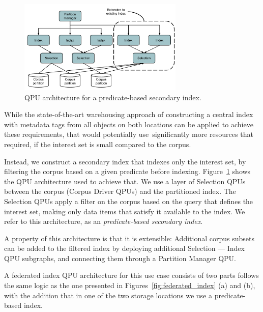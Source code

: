 \begin{figure}
  \centering
    \includegraphics[width=0.7\textwidth]{./figures/case_studies/predicate_based_index.pdf}
  \caption{QPU architecture for a predicate-based secondary index.}
  \label{fig:predicate_based_index}
\end{figure}

While the state-of-the-art warehousing approach of constructing a central index with metadata tags from all objects
on both locations can be applied to achieve these requirements,
that would potentially use significantly more resources that required,
if the interest set is small compared to the corpus.

Instead, we construct a secondary index that indexes only the interest set,
by filtering the corpus based on a given predicate before indexing.
Figure~\ref{fig:predicate_based_index} shows the QPU architecture used to achieve that.
We use a layer of Selection QPUs between the corpus (Corpus Driver QPUs) and the partitioned index.
The Selection QPUs apply a filter on the corpus based on the query that defines the interest set,
making only data items that satisfy it available to the index.
We refer to this architecture, as an \textit{predicate-based secondary index}.

A property of this architecture is that it is extensible:
Additional corpus subsets can be added to the filtered index by deploying additional Selection --- Index QPU subgraphs,
and connecting them through a Partition Manager QPU.

A federated index QPU architecture for this use case consists of two parts
follows the same logic as the one presented in Figures~\ref{fig:federated_index} (a) and (b),
with the addition that in one of the two storage locations we use a predicate-based index.



